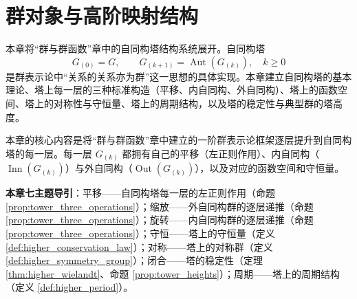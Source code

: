 \chapter{群对象与高阶映射结构}
\label{chap:higher_group}

\begin{remark}[本章定位]\label{rem:higher_group_chapter_positioning}
本章将“群与群函数”章中的自同构塔结构系统展开。自同构塔
\[
G_{(0)} = G,\qquad G_{(k+1)} = \operatorname{Aut}(G_{(k)}),\quad k\ge 0
\]
是群表示论中“关系的关系亦为群”这一思想的具体实现。本章建立自同构塔的基本理论、塔上每一层的三种标准构造（平移、内自同构、外自同构）、塔上的函数空间、塔上的对称性与守恒量、塔上的周期结构，以及塔的稳定性与典型群的塔高度。

本章的核心内容是将“群与群函数”章中建立的一阶群表示论框架逐层提升到自同构塔的每一层。每一层 $G_{(k)}$ 都拥有自己的平移（左正则作用）、内自同构（$\operatorname{Inn}(G_{(k)})$）与外自同构（$\operatorname{Out}(G_{(k)})$），以及对应的函数空间和守恒量。

\textbf{本章七主题导引}：平移——自同构塔每一层的左正则作用（命题 \ref{prop:tower_three_operations}）；缩放——外自同构群的逐层递推（命题 \ref{prop:tower_three_operations}）；旋转——内自同构群的逐层递推（命题 \ref{prop:tower_three_operations}）；守恒——塔上的守恒量（定义 \ref{def:higher_conservation_law}）；对称——塔上的对称群（定义 \ref{def:higher_symmetry_group}）；闭合——塔的稳定性（定理 \ref{thm:higher_wielandt}、命题 \ref{prop:tower_heights}）；周期——塔上的周期结构（定义 \ref{def:higher_period}）。
\end{remark}

